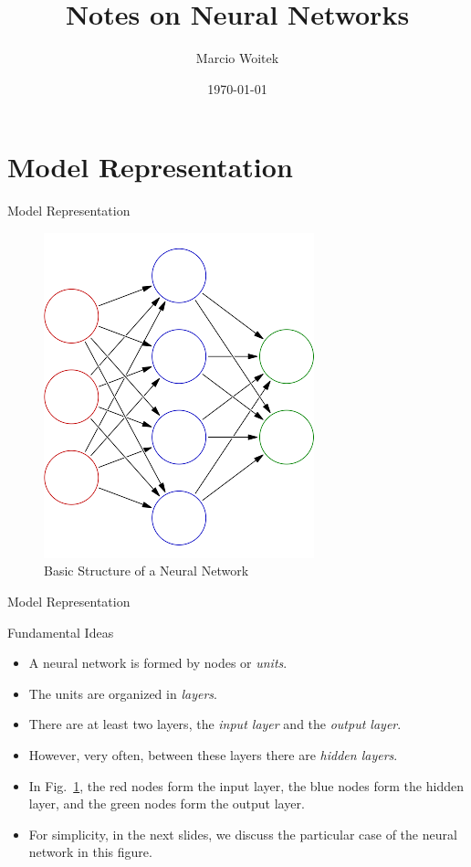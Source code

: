 \documentclass[8pt,american]{beamer}
\author{Marcio Woitek}
\date{\today}
\title[]{Notes on Neural Networks}
\begin{document}
\frame{\titlepage}

\section[]{Model Representation}

\begin{frame}{Model Representation}

\begin{figure}[H]
\centering
\includegraphics[height=0.8\textheight]{neural_network.png}
\caption{Basic Structure of a Neural Network}
\label{fig:neural_network}
\end{figure}

\end{frame}

\begin{frame}{Model Representation}

\begin{block}{Fundamental Ideas}
\begin{itemize}
\justifying
\item A neural network is formed by nodes or \textit{units}.
\item The units are organized in \textit{layers}.
\item There are at least two layers, the \textit{input layer} and the
  \textit{output layer}.
\item However, very often, between these layers there are
  \textit{hidden layers}.
\item In Fig.~\ref{fig:neural_network}, the red nodes form the input layer, the
  blue nodes form the hidden layer, and the green nodes form the output layer.
\item For simplicity, in the next slides, we discuss the particular case of the
  neural network in this figure.
\end{itemize}
\end{block}

\end{frame}
\end{document}

